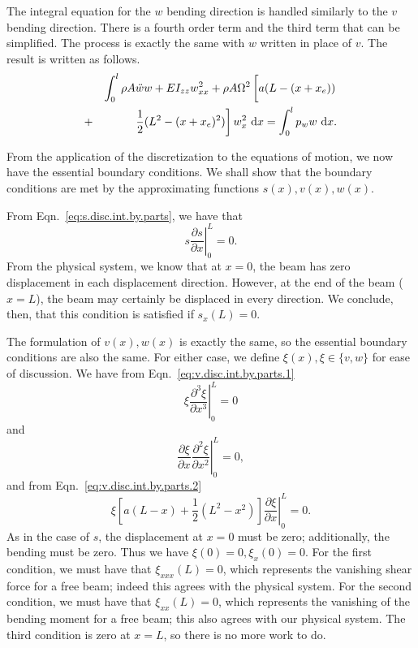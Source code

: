 The integral equation for the $w$ bending direction is handled similarly to the $v$ bending direction. There is a fourth order term and the third term that can be simplified. The process is exactly the same with $w$ written in place of $v$. The result is written as follows.
\begin{eqnarray}
& &\int_0^l\rho A\ddot ww+EI_{zz}w_{xx}^2+\rho A\Omega^2\left[a(L-(x+x_e))\vphantom{\frac{0}{0}}\right. \label{eq:w.bending.integral.eqn}\\
&+& \left.\frac{1}{2}(L^2-(x+x_e)^2)\right]w_x^2\text{ d}x = \int_0^lp_ww\text{ d}x.\nonumber 
\end{eqnarray}

From the application of the discretization to the equations of motion, we now have the essential boundary conditions. We shall show that the boundary conditions are met by the approximating functions $s(x), v(x), w(x)$.

From Eqn.~\ref{eq:s.disc.int.by.parts}, we have that 
\begin{equation}
\left.s\frac{\partial s}{\partial x}\right|_0^L = 0.
\end{equation}
From the physical system, we know that at $x=0$, the beam has zero displacement in each displacement direction. However, at the end of the beam ($x=L$), the beam may certainly be displaced in every direction. We conclude, then, that this condition is satisfied if $s_x(L) = 0$. 

The formulation of $v(x),w(x)$ is exactly the same, so the essential boundary conditions are also the same. For either case, we define $\xi(x), \xi\in\{v,w\}$ for ease of discussion. We have from Eqn.~\ref{eq:v.disc.int.by.parts.1}
\begin{equation}
\left.\xi\frac{\partial^3 \xi}{\partial x^3}\right|_0^L = 0
\end{equation}
and  
\begin{equation}
\left.\frac{\partial \xi}{\partial x}\frac{\partial^2 \xi}{\partial x^2}\right|_0^L = 0,
\end{equation}
and from Eqn.~\ref{eq:v.disc.int.by.parts.2}
\begin{equation}
\left.\xi\left[a(L-x)+\frac{1}{2}(L^2-x^2)\right]\frac{\partial \xi}{\partial x}\right|_0^L = 0.
\end{equation}
As in the case of $s$, the displacement at $x=0$ must be zero; additionally, the bending must be zero. Thus we have $\xi(0)=0,\xi_x(0)=0$. For the first condition, we must have that $\xi_{xxx}(L) = 0$, which represents the vanishing shear force for a free beam; indeed this agrees with the physical system. For the second condition, we must have that $\xi_{xx}(L) = 0$, which represents the vanishing of the bending moment for a free beam; this also agrees with our physical system. The third condition is zero at $x=L$, so there is no more work to do. 

